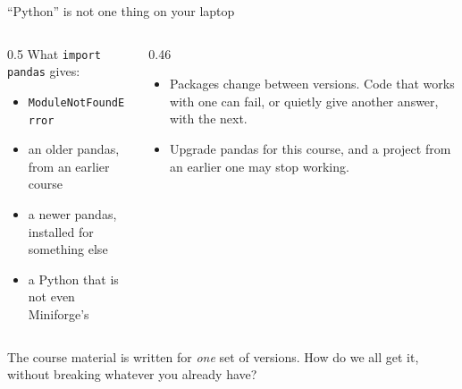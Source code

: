 \documentclass[aspectratio=169,11pt]{beamer}
\newcommand{\code}[1]{\texttt{#1}}
\begin{document}
\begin{frame}{``Python'' is not one thing on your laptop}
  \begin{columns}[T]
    \begin{column}{0.5\textwidth}
      What \code{import pandas} gives:
      \begin{itemize}
        \item \code{ModuleNotFoundError}
        \item an older pandas, from an earlier course
        \item a newer pandas, installed for something else
        \item a Python that is not even Miniforge's
      \end{itemize}
    \end{column}
    \begin{column}{0.46\textwidth}
      \begin{itemize}
        \item Packages change between versions. Code that works with one can fail, or quietly give another answer, with the next.
        \item Upgrade pandas for this course, and a project from an earlier one may stop working.
      \end{itemize}
    \end{column}
  \end{columns}
  \vspace{1.2em}
  \centering
  The course material is written for \emph{one} set of versions. How do we all get it,\\
  without breaking whatever you already have?
\end{frame}
\end{document}
